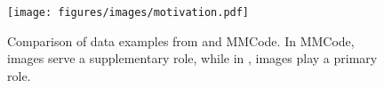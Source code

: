 \begin{figure}[t] \centering
    \texttt{[image: figures/images/motivation.pdf]}
    \caption{Comparison of data examples from \benchmark and MMCode. In MMCode, images serve a supplementary role, while in \benchmark, images play a primary role.} \label{fig:motivation}
\end{figure}